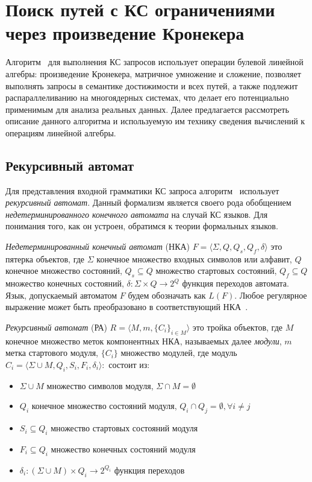 \section{Поиск путей с КС ограничениями через произведение Кронекера}

Алгоритм~\cite{inbook:kronecker_cfpq_adbis} для выполнения КС запросов использует операции булевой линейной  алгебры: произведение Кронекера, матричное умножение и сложение, позволяет выполнять запросы в семантике достижимости и всех путей, а также подлежит распараллеливанию на многоядерных системах, что делает его потенциально применимым для анализа реальных данных. Далее предлагается рассмотреть описание данного алгоритма и используемую им технику сведения вычислений к операциям линейной алгебры.

\subsection{Рекурсивный автомат}

Для представления входной грамматики КС запроса алгоритм~\cite{inbook:kronecker_cfpq_adbis} использует \textit{рекурсивный автомат}. Данный формализм является своего рода обобщением \textit{недетерминированного конечного автомата} на случай КС языков. Для понимания того, как он устроен, обратимся к теории формальных языков.

\textit{Недетерминированный конечный автомат} (НКА) $F = \langle \Sigma, Q, Q_s, Q_f, \delta \rangle$ это пятерка объектов, где $\Sigma$ конечное множество входных символов или алфавит, $Q$ конечное множество состояний, $Q_s \subseteq Q$ множество стартовых состояний, $Q_f \subseteq Q$ множество конечных состояний, $\delta : \Sigma \times Q \rightarrow 2^Q$ функция переходов автомата. Язык, допускаемый автоматом $F$ будем обозначать как $L(F)$. Любое регулярное выражение может быть преобразовано в соответствующий НКА~\cite{book:automata_theory}. 

\textit{Рекурсивный автомат} (РА) $R = \langle M, m, \{C_i\}_{i \in M} \rangle$ это тройка объектов, где $M$ конечное множество меток компонентных НКА, называемых далее \textit{модули}, $m$ метка стартового модуля, $\{C_i\}$ множество модулей, где модуль $C_i = \langle \Sigma \cup M, Q_i, S_i, F_i, \delta _i \rangle: $ состоит из:

\begin{itemize}
    \item $\Sigma \cup M$ множество символов модуля, $\Sigma \cap M = \emptyset$
    \item $Q_i$ конечное множество состояний модуля, $Q_i \cap Q_j = \emptyset, \forall i \neq j$
    \item $S_i \subseteq Q_i$ множество стартовых состояний модуля
    \item $F_i \subseteq Q_i$ множество конечных состояний модуля 
    \item $\delta_i : (\Sigma \cup M) \times Q_i \rightarrow 2^{Q_i}$ функция переходов
\end{itemize}

